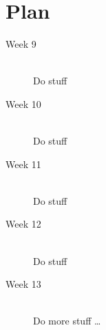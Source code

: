 \documentclass[11pt]{article} %
\theoremstyle{plain}
\theoremstyle{definition}
\theoremstyle{remark}
\numberwithin{equation}{section} %
\numberwithin{figure}{section} %
\numberwithin{table}{section} %
\begin{document}








\section{Plan}


\begin{description}
  \item[Week 9] \hfill \\
  Do stuff
  \item[Week 10] \hfill \\
  Do stuff
  \item[Week 11] \hfill \\
  Do stuff
  \item[Week 12] \hfill \\
  Do stuff
  \item[Week 13] \hfill \\
  Do more stuff \ldots
\end{description}



\end{document}

